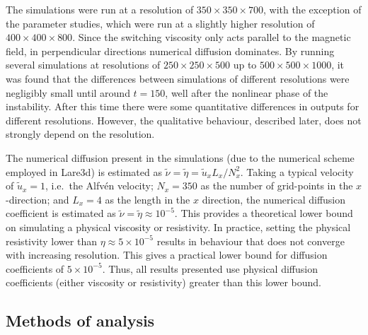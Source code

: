 The simulations were run at a resolution of $350 \times 350 \times 700$, with the exception of the parameter studies, which were run at a slightly higher resolution of $400 \times 400 \times 800$. Since the switching viscosity only acts parallel to the magnetic field, in perpendicular directions numerical diffusion dominates. By running several simulations at resolutions of $250 \times 250 \times 500$ up to $500 \times 500 \times 1000$, it was found that the differences between simulations of different resolutions were negligibly small until around $t=150$, well after the nonlinear phase of the instability. After this time there were some quantitative differences in outputs for different resolutions. However, the qualitative behaviour, described later, does not strongly depend on the resolution.

The numerical diffusion present in the simulations (due to the numerical scheme employed in Lare3d) is estimated as $\tilde{\nu} = \tilde{\eta} = \tilde{u}_x L_x/N_x^2$. Taking a typical velocity of $\tilde{u}_x = 1$, i.e.\ the Alfv\'en velocity; $N_x = 350$ as the number of grid-points in the $x$-direction; and $L_x = 4$ as the length in the $x$ direction, the numerical diffusion coefficient is estimated as $\tilde{\nu} = \tilde{\eta} \approx 10^{-5}$. This provides a theoretical lower bound on simulating a physical viscosity or resistivity. In practice, setting the physical resistivity lower than $\eta \approx 5\times10^{-5}$ results in behaviour that does not converge with increasing resolution. This gives a practical lower bound for diffusion coefficients of $5 \times 10^{-5}$. Thus, all results presented use physical diffusion coefficients (either viscosity or resistivity) greater than this lower bound.

\subsection{Methods of analysis}

\label{sec:kink_methods_analysis}



